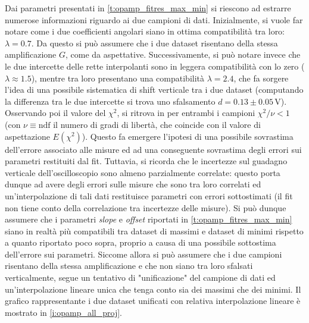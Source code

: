 \documentclass[a4paper,11pt]{article} %
\begin{document}
\noindent Dai parametri presentati in  \autoref{t:opamp_fitres_max_min} si riescono ad estrarre numerose informazioni
riguardo ai due campioni di dati. Inizialmente, si vuole far notare come i due coefficienti angolari siano in ottima
compatibilità tra loro: $\lambda=0.7$. Da questo si può assumere che i due dataset risentano della stessa amplificazione
$G$, come da aspettative. Successivamente, si può notare invece che le due intercette delle rette interpolanti sono in
leggera compatibilità con lo zero ($\lambda \approx 1.5$), mentre tra loro presentano una compatibilità $\lambda=2.4$,
che fa sorgere l'idea di una possibile sistematica di shift verticale tra i due dataset (computando la differenza tra le
due intercette si trova uno sfalsamento $d=0.13 \pm 0.05 \,\si{\volt}$). Osservando poi il valore del $\chi^2$, si
ritrova in per entrambi i campioni $\chi^2/\nu<1$ (con $\nu\equiv\text{ndf}$ il numero di gradi di libertà, che coincide
con il valore di aspettazione $E(\chi^2)$). Questo fa emergere l'ipotesi di una possibile sovrastima dell'errore
associato alle misure ed ad una conseguente sovrastima degli errori sui parametri restituiti dal fit. Tuttavia, si
ricorda che le incertezze sul guadagno verticale dell'oscilloscopio sono almeno parzialmente correlate: questo porta
dunque ad avere degli errori sulle misure che sono tra loro correlati ed un'interpolazione di tali dati restituisce
parametri con errori sottostimati (il fit non tiene conto della correlazione tra incertezze delle misure). Si può dunque
assumere che i parametri \textit{slope} e \textit{offset} riportati in \autoref{t:opamp_fitres_max_min} siano in realtà
più compatibili tra dataset di massimi e dataset di minimi rispetto a quanto riportato poco sopra, proprio a causa di
una possibile sottostima dell'errore sui parametri. Siccome allora si può assumere che i due campioni risentano della
stessa amplificazione e che non siano tra loro sfalsati verticalmente, segue un tentativo di "unificazione" del campione
di dati ed un'interpolazione lineare unica che tenga conto sia dei massimi che dei minimi. Il grafico rappresentante i
due dataset unificati con relativa interpolazione lineare è mostrato in \autoref{i:opamp_all_proj}. 
\end{document}
